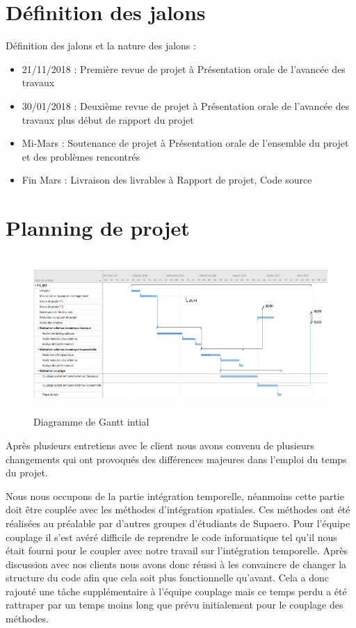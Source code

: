 \documentclass[a4paper,12pt]{report}
\theoremstyle{break}
\begin{document}
\section{Définition des jalons}

    Définition des jalons et la nature des jalons :
   \begin{itemize}[label=\textbullet]
   	\item 21/11/2018 : Première revue de projet à Présentation orale de l’avancée des travaux
   	\item 30/01/2018 : Deuxième revue de projet à Présentation orale de l’avancée des travaux plus début de rapport du projet
   	\item  Mi-Mars : Soutenance de projet à Présentation orale de l’ensemble du projet et des problèmes rencontrés
   	\item  Fin Mars : Livraison des livrables à Rapport de projet, Code source
    \end{itemize}

\section{Planning de projet}

  \begin{figure}[h]
\centering
    \includegraphics[width=\textwidth, height=6cm]{images/Gant.png}
  	\caption{Diagramme de Gantt intial} 
   \label{fig:Gantt_initial}
\end{figure}

Après plusieurs entretiens avec le client nous avons convenu de plusieurs changements qui ont provoqués des différences majeures dans l’emploi du temps du projet. 

Nous nous occupons de la partie intégration temporelle, néanmoins cette partie doit être couplée avec les méthodes d’intégration spatiales. Ces méthodes ont été réalisées au préalable par d’autres groupes d’étudiants de Supaero. Pour l’équipe couplage il s’est avéré difficile de reprendre le code informatique tel qu’il nous était fourni pour le coupler avec notre travail sur l’intégration temporelle. Après discussion avec nos clients nous avons donc réussi à les convaincre de changer la structure du code afin que cela soit plus fonctionnelle qu’avant. Cela a donc rajouté une tâche supplémentaire à l’équipe couplage mais ce temps perdu a été rattraper par un temps moins long que prévu initialement pour le couplage des méthodes. 
\end{document}
